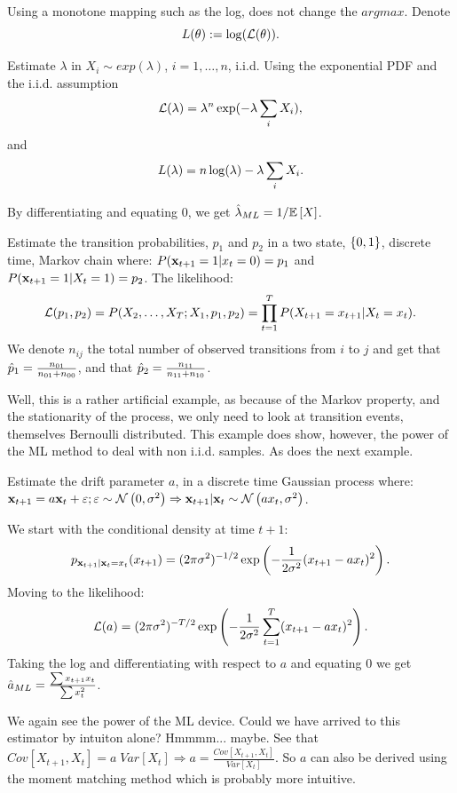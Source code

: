 Using a monotone mapping such as the log, does not change the $argmax$. 
Denote $$L(\theta):=\log(\mathcal{L}(\theta)).$$

 
\begin{example}

Estimate $\lambda$ in $X_i \sim exp(\lambda)$, $i=1,\dots,n$, i.i.d.
Using the exponential PDF and the i.i.d. assumption
$$ \mathcal{L}(\lambda) = \lambda^n \exp(-\lambda \sum_i X_i), $$
and 
$$ L(\lambda) = n \log(\lambda) -\lambda \sum_i X_i. $$

By differentiating and equating $0$, we get $\hat{\lambda}_{ML}=1/\mathbb{E}\left[X\right]$.

\end{example}

\begin{example}

Estimate the transition probabilities,  $p_1$ and $p_2$ in a two state, $\left\{ 0,1 \right\}$, discrete time, Markov chain where:
$P(\mathbf{x}_{t+1}=1|x_{t}=0)=p_1$ and $P(\mathbf{x}_{t+1}=1|X_{t}=1)=p_2$.
The likelihood:
$$
  \mathcal{L}(p_1,p_2)=
  P(X_2,\dots,X_T;X_1,p_1,p_2)=
  \prod_{t=1}^T P(X_{t+1}=x_{t+1}|X_{t}=x_t).
$$
We denote $n_{ij}$ the total number of observed transitions from $i$ to $j$ and get that $\hat{p}_1=\frac{n_{01}}{n_{01}+n_{00}}$, and that $\hat{p}_2=\frac{n_{11}}{n_{11}+n_{10}}$.

\begin{remark}[Confession]
Well, this is a rather artificial example, as because of the Markov property, and the stationarity of the process, we only need to look at transition events, themselves Bernoulli distributed. 
This example does show, however, the power of the ML method to deal with non i.i.d. samples. As does the next example.
\end{remark}
\end{example}




\begin{example}
Estimate the drift parameter $a$,  in a discrete time Gaussian process where:
$\mathbf{x}_{t+1}=a \mathbf{x}_t+ \varepsilon; \varepsilon \sim \mathcal{N}\left(0,\sigma^2\right) \Rightarrow \mathbf{x}_{t+1}|\mathbf{x}_t \sim \mathcal{N}\left(a x_t,\sigma^2\right)$.

We start with the conditional density at time $t+1$:
$$
  p_{\mathbf{x}_{t+1}|\mathbf{x}_t=x_t}(x_{t+1}) = 
  (2 \pi \sigma^2)^{-1/2} \exp \left( 
    -\frac{1}{2 \sigma^2}(x_{t+1}-a x_t)^2 
  \right).
$$
Moving to the likelihood:
$$
  \mathcal{L}(a) = 
  (2 \pi \sigma^2)^{-T/2} \exp \left(
    -\frac{1}{2 \sigma^2}\sum_{t=1}^T (x_{t+1}-a x_t)^2 
  \right).
$$
Taking the log and differentiating with respect to $a$ and equating $0$ we get $\hat{a}_{ML}=\frac{\sum x_{t+1}x_{t}}{\sum x_t^2}$.

We again see the power of the ML device.
Could we have arrived to this estimator by intuiton alone? Hmmmm... maybe. 
See that $Cov[X_{t+1},X_t] = a \; Var[X_t] \Rightarrow a=\frac{Cov[X_{t+1},X_t]}{Var[X_t]}$.
So $a$ can also be derived using the moment matching method which is probably more intuitive.

\end{example}




